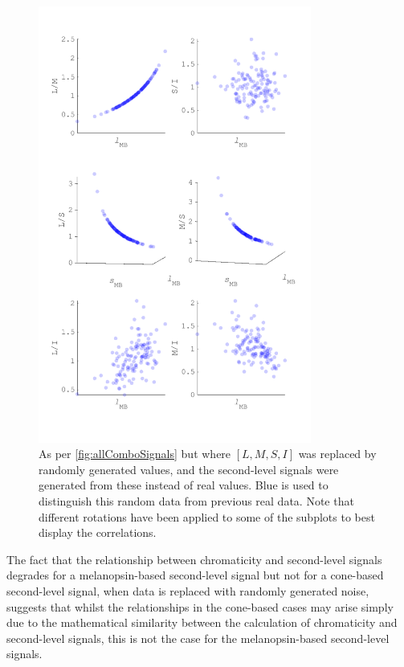 \begin{figure}
\includegraphics[max width=0.8\textwidth]{figs/comp/predictingChromaticity/allComboSignals_rand.pdf} 
\caption{As per \ref{fig:allComboSignals} but where $[L,M,S,I]$ was replaced by randomly generated values, and the second-level signals were generated from these instead of real values. Blue is used to distinguish this random data from previous real data. Note that different rotations have been applied to some of the subplots to best display the correlations.}
\label{fig:allComboSignals_rand}
\end{figure}

The fact that the relationship between chromaticity and second-level signals degrades for a melanopsin-based second-level signal but not for a cone-based second-level signal, when data is replaced with randomly generated noise, suggests that whilst the relationships in the cone-based cases may arise simply due to the mathematical similarity between the calculation of chromaticity and second-level signals, this is not the case for the melanopsin-based second-level signals. 


